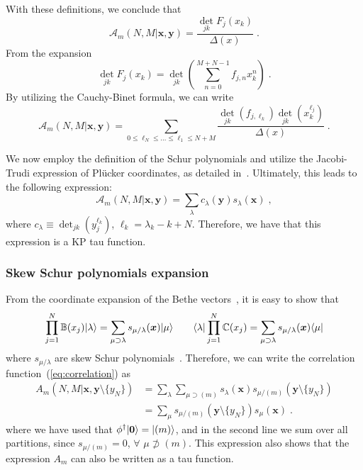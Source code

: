 \documentclass[a4paper,11pt]{amsart}
\begin{document}
With these definitions, we conclude that
\begin{equation}
\mathcal{A}_m(N,M|\bm{x}, \bm{y}) =\frac{\det_{jk} F_j(x_k)}{\Delta(x)}\; .
\end{equation}
From the expansion 
\begin{equation}
  \det_{jk} F_j(x_k) = \det_{jk} \left(  \sum_{n=0}^{M + N -1} f_{j, n} x_k^n \right) \; .
\end{equation}
By utilizing the Cauchy-Binet formula, we can write
\begin{equation}
    \mathcal{A}_m(N,M|\bm{x}, \bm{y})
  = \sum_{0\leq \ell_N\leq \dots \leq \ell_1 \leq N+M}
  \frac{\det_{jk}(f_{j, \ell_k}) \det_{jk}(x_k^{\ell_j})}{\Delta(x)}\; . 
\end{equation}

We now employ the definition of the Schur polynomials and utilize the
Jacobi-Trudi expression of Plücker coordinates, as detailed
in~\cite{Alexandrov:2012tr}. Ultimately, this leads to the following
expression:
\begin{equation}
\mathcal{A}_m(N,M|\bm{x}, \bm{y}) =
\sum_{\lambda} c_\lambda(\bm{y}) s_\lambda(\bm{x}) \; ,
\end{equation}
where \(c_\lambda \equiv \det_{jk}(y_j^{\ell_k})\),  \(\ell_k = \lambda_k - k +N\).
Therefore, we have that this expression is a KP tau function. 


\subsubsection{Skew Schur polynomials expansion}
From the coordinate expansion of the Bethe
vectors~\cite{Bogoliubov2005, Tsilevich:2006}, it is easy to show that
\begin{equation}
\prod_{j=1}^N \mathbb{B}(x_j)\lvert\lambda\rangle  = \sum_{\mu \supset \lambda } s_{\mu/\lambda}(\bm{x})\lvert\mu\rangle\qquad 
 \langle\lambda\rvert \prod_{j=1}^N \mathbb{C}(x_j) = \sum_{\mu \supset \lambda } s_{\mu/\lambda}(\bm{x})\langle\mu\rvert
\end{equation}
where \(s_{\mu/\lambda}\) are skew Schur polynomials~\cite{Macdonald:1998}.
Therefore, we can write the correlation function~(\ref{eq:correlation}) as 
\begin{equation}
\begin{split}
  A_m(N, M|\bm{x}, \bm{y}\setminus \{y_N\})
  & = \sum_\lambda \sum_{\mu \supset (m)} s_{\lambda}(\bm{x}) s_{\mu/(m)}(\bm{y}\setminus\{y_N\})\\
  & = \sum_\mu s_{\mu/(m)}(\bm{y}\setminus\{y_N\}) s_{\mu}(\bm{x})\; .
\end{split}
\end{equation}
where we have used that \(\phi^\dagger \lvert\bm{0}\rangle = \lvert(m)\rangle\), and in the second line
we sum over all partitions, since \(s_{\mu/(m)} = 0\), \(\forall \) \(\mu \not \supset (m)\).
This expression also shows that the expression \(A_m\) can also be written as a tau function. 
\end{document}
